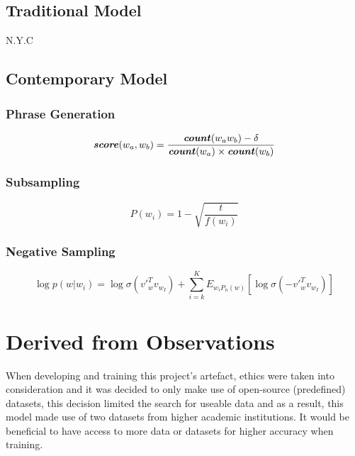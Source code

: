\subsection{Traditional Model}

N.Y.C

\subsection{Contemporary Model}

\subsubsection{Phrase Generation}

\begin{equation}
    \textbf{\textit{score}}(w_{a}, w_{b}) = \frac{\textbf{\textit{count}}(w_{a}w_{b}) - \delta}{\textbf{\textit{count}}(w_{a}) \times \textbf{\textit{count}}(w_{b})}
\end{equation}

\subsubsection{Subsampling}

\begin{equation}
    P(w_{i}) = 1 - \sqrt{\frac{t}{f(w_{i})}}
\end{equation}

\subsubsection{Negative Sampling}

\begin{equation}
    \log p(w | w_{i}) = \log \sigma ({v'}_{w}^{T} v_{w_{I}}) + \sum_{i=k}^{K} E_{w_{i}P_{n}(w)} \left [ \log \sigma (-{v'}_{w}^{T} v_{w_{I}}) \right ]
\end{equation}


\section{Derived from Observations}

When developing and training this project’s artefact, ethics were taken into consideration and it was decided to only make use of open-source (predefined) datasets, this decision limited the search for useable data and as a result, this model made use of two datasets from higher academic institutions. It would be beneficial to have access to more data or datasets for higher accuracy when training.

